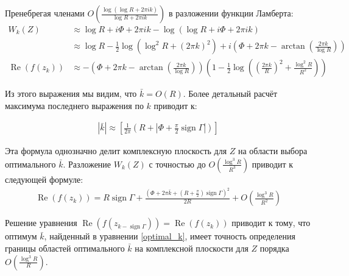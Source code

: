 \documentclass[a4paper, 12pt]{article}
\DeclareMathOperator*{\sign}{sign}
\DeclareMathOperator*{\Real}{Re}
\newenvironment{eqw}{\begin{equation} \begin{aligned}}   
    {\end{aligned}    \end{equation}}
\begin{document}


Пренебрегая членами $O\left(\frac{\log\left(\log R + 2\pi i k\right)}{\log R  + 2\pi i k}\right)$ в разложении функции Ламберта:
\begin{eqw}
    W_k\left(Z\right) &\approx \log R + i\Phi + 2\pi i k - \log\left(\log R + i\Phi+ 2\pi i k\right) \\
    &\approx \log R - \frac{1}{2}\log\left(\log^2 R + (2\pi k)^2\right) + 
    i\left(\Phi + 2\pi k - \arctan\left(\frac{2\pi k}{\log R}\right)\right) \\
    \Real\left(f(z_k)\right) &\approx
    -\left(\Phi + 2\pi k - \arctan\left(\frac{2\pi k}{\log R}\right)\right)\left(1-
    \frac{1}{2}\log \left(\left(\frac{2\pi k}{R}\right)^2+\frac{\log^2 R}{R^2}\right)
    \right)
\end{eqw}

Из этого выражения мы видим, что $\bar k = O(R)$. Более детальный расчёт максимума последнего выражения по $k$ приводит к:

\begin{eqw}\label{optimal_k}
    |\bar k|\approx \left[ \frac{1}{2\pi}\left(R + \left|\Phi + \frac{\pi}{2}\sign \Gamma\right|\right)\right]
\end{eqw}

Эта формула однозначно делит комплексную плоскость для $Z$ на области выбора оптимального $\bar k$. Разложение $W_{k}(Z)$ с точностью до $O\left(\frac{\log^3 R}{R^3}\right)$ приводит к следующей формуле:
\begin{eqw}
    \Real(f(z_k)) =  R\sign \Gamma + \frac{\left(\Phi + 2\pi \bar k +  \left(R+\frac{\pi}{2} \right)\sign\Gamma\right)^2}{2R} +
     O\left(\frac{\log^3 R}{R^2}\right)
\end{eqw}

Решение уравнения $\Real(f(z_{k-\sign \Gamma})) = \Real(f(z_{k}))$ приводит к тому, что оптимум $\bar k$, найденный в уравнении \eqref{optimal_k}, имеет точность определения границы областей оптимального $\bar k$ на комплексной плоскости для $Z$ порядка $O\left(\frac{\log^3 R}{R}\right)$.
\end{document}
